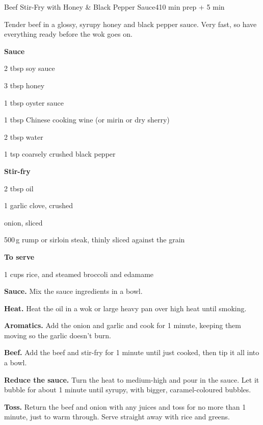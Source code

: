 \begin{recipebox}{Beef Stir-Fry with Honey \& Black Pepper Sauce}{4}{10 min prep + 5 min}

Tender beef in a glossy, syrupy honey and black pepper sauce. Very fast, so have
everything ready before the wok goes on.

\begin{ingredients}
  \item[] \textbf{Sauce}
  \item 2 tbsp soy sauce
  \item 3 tbsp honey
  \item 1 tbsp oyster sauce
  \item 1 tbsp Chinese cooking wine (or mirin or dry sherry)
  \item 2 tbsp water
  \item 1 tsp coarsely crushed black pepper
  \item[] \textbf{Stir-fry}
  \item 2 tbsp oil
  \item 1 garlic clove, crushed
  \item {} onion, sliced
  \item 500\,g rump or sirloin steak, thinly sliced against the grain
  \item[] \textbf{To serve}
  \item 1 cups rice, and steamed broccoli and edamame
\end{ingredients}

\begin{method}
  \item \textbf{Sauce.} Mix the sauce ingredients in a bowl.
  \item \textbf{Heat.} Heat the oil in a wok or large heavy pan over high heat until
        smoking.
  \item \textbf{Aromatics.} Add the onion and garlic and cook for 1 minute, keeping
        them moving so the garlic doesn't burn.
  \item \textbf{Beef.} Add the beef and stir-fry for 1 minute until just cooked,
        then tip it all into a bowl.
  \item \textbf{Reduce the sauce.} Turn the heat to medium-high and pour in the
        sauce. Let it bubble for about 1 minute until syrupy, with bigger,
        caramel-coloured bubbles.
  \item \textbf{Toss.} Return the beef and onion with any juices and toss for no more
        than 1 minute, just to warm through. Serve straight away with rice and
        greens.
\end{method}


\end{recipebox}
